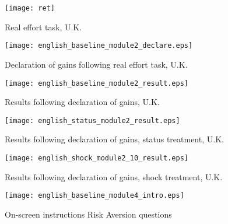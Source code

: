 \documentclass[12pt]{article}
\begin{document}
\clearpage



\begin{figure}[ht]
\centerline{\texttt{[image: ret]}}
\caption{Real effort task, U.K.}
\end{figure}
\clearpage

\begin{comment}
\begin{figure}[ht]
\centerline{\texttt{[image: RETresponse]}}
\caption{Real effort task screen with correct answer, U.K.}
\end{figure}
\clearpage
\end{comment}

\begin{figure}[ht]
\centerline{\texttt{[image: english\_baseline\_module2\_declare.eps]}}
\caption{Declaration of gains following real effort task, U.K.}
\end{figure}

\vspace{1cm}

\begin{figure}[ht]
\centerline{\texttt{[image: english\_baseline\_module2\_result.eps]}}
\caption{Results following declaration of gains, U.K.}
\end{figure}


\clearpage

\begin{figure}[ht]
\centerline{\texttt{[image: english\_status\_module2\_result.eps]}}
\caption{Results following declaration of gains, status treatment, U.K.}
\end{figure}

\vspace{1cm}

\begin{figure}[ht]
\centerline{\texttt{[image: english\_shock\_module2\_10\_result.eps]}}
\caption{Results following declaration of gains, shock treatment, U.K.}
\end{figure}

\clearpage


\begin{figure}[ht]
\centerline{\texttt{[image: english\_baseline\_module4\_intro.eps]}}
\caption{On-screen instructions Risk Aversion questions}
\label{fig:screen_risk1}
\end{figure}

\vspace{1cm}
\end{document}
